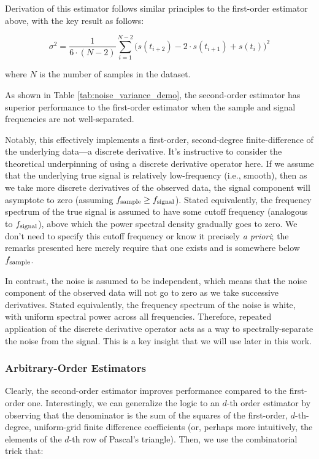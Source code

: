 \documentclass[conf]{new-aiaa}
\begin{document}
    Derivation of this estimator follows similar principles to the first-order estimator above, with the key result as follows:

    \begin{equation}
        \sigma^2 = \frac{1}{6 \cdot (N-2)} \sum_{i=1}^{N-2} \Big( s(t_{i+2}) - 2 \cdot s(t_{i+1}) + s(t_i) \Big)^2
        \label{eq:2nd_order_noise_estimator}
    \end{equation}

    \noindent where $N$ is the number of samples in the dataset.

    As shown in Table \ref{tab:noise_variance_demo}, the second-order estimator has superior performance to the first-order estimator when the sample and signal frequencies are not well-separated.

    Notably, this effectively implements a first-order, second-degree finite-difference of the underlying data—a discrete derivative. It's instructive to consider the theoretical underpinning of using a discrete derivative operator here. If we assume that the underlying true signal is relatively low-frequency (i.e., smooth), then as we take more discrete derivatives of the observed data, the signal component will asymptote to zero (assuming $f_{\rm sample} \geq f_{\rm signal}$). Stated equivalently, the frequency spectrum of the true signal is assumed to have some cutoff frequency (analogous to $f_{\rm signal}$), above which the power spectral density gradually goes to zero. We don't need to specify this cutoff frequency or know it precisely \emph{a priori}; the remarks presented here merely require that one exists and is somewhere below $f_{\rm sample}$.

    In contrast, the noise is assumed to be independent, which means that the noise component of the observed data will not go to zero as we take successive derivatives. Stated equivalently, the frequency spectrum of the noise is white, with uniform spectral power across all frequencies. Therefore, repeated application of the discrete derivative operator acts as a way to spectrally-separate the noise from the signal. This is a key insight that we will use later in this work.

    \subsubsection{Arbitrary-Order Estimators}

    Clearly, the second-order estimator improves performance compared to the first-order one. Interestingly, we can generalize the logic to an $d$-th order estimator by observing that the denominator is the sum of the squares of the first-order, $d$-th-degree, uniform-grid finite difference coefficients (or, perhaps more intuitively, the elements of the $d$-th row of Pascal's triangle). Then, we use the combinatorial trick that:
\end{document}
